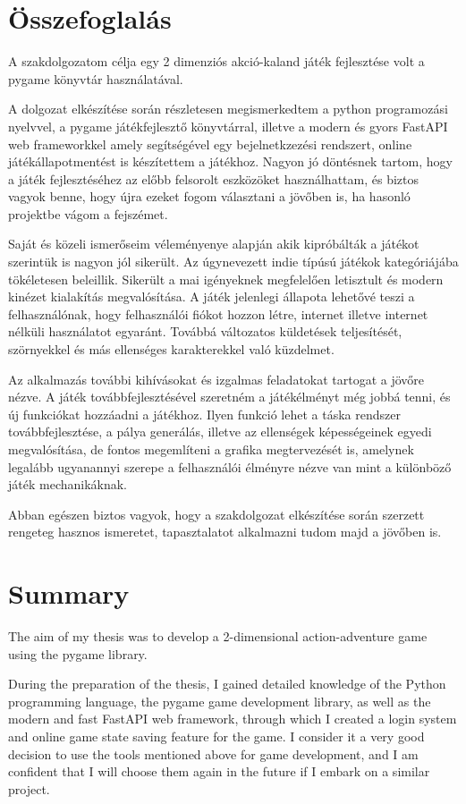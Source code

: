 \chapter{Összefoglalás}

\indent \indent A szakdolgozatom célja egy 2 dimenziós akció-kaland játék fejlesztése volt a pygame könyvtár használatával.

A dolgozat elkészítése során részletesen megismerkedtem a python programozási nyelvvel, a pygame játékfejlesztő könyvtárral, illetve a modern és gyors FastAPI web frameworkkel amely segítségével egy bejelnetkzezési rendszert, online játékállapotmentést is készítettem a játékhoz. Nagyon jó döntésnek tartom, hogy a játék fejlesztéséhez az előbb felsorolt eszközöket használhattam, és biztos vagyok benne, hogy újra ezeket fogom választani a jövőben is, ha hasonló projektbe vágom a fejszémet.

Saját és közeli ismerőseim véleményenye alapján akik kipróbálták a játékot szerintük is nagyon jól sikerült. Az úgynevezett indie típúsú játékok kategóriájába tökéletesen beleillik. Sikerült a mai igényeknek megfelelően letisztult és modern kinézet kialakítás megvalósítása. A játék jelenlegi állapota lehetővé teszi a felhasználónak, hogy felhasználói fiókot hozzon létre, internet illetve internet nélküli használatot egyaránt. Továbbá változatos küldetések teljesítését, szörnyekkel és más ellenséges karakterekkel való küzdelmet.

Az alkalmazás további kihívásokat és izgalmas feladatokat tartogat a jövőre nézve. A játék továbbfejlesztésével szeretném a játékélményt még jobbá tenni, és új funkciókat hozzáadni a játékhoz. Ilyen funkció lehet a táska rendszer továbbfejlesztése, a pálya generálás, illetve az ellenségek képességeinek egyedi megvalósítása, de fontos megemlíteni a grafika megtervezését is, amelynek legalább ugyanannyi szerepe a felhasználói élményre nézve van mint a különböző játék mechanikáknak.  

Abban egészen biztos vagyok, hogy a szakdolgozat elkészítése során szerzett rengeteg hasznos ismeretet, tapasztalatot alkalmazni tudom majd a jövőben is.

\chapter{Summary}

\indent \indent The aim of my thesis was to develop a 2-dimensional action-adventure game using the pygame library.

During the preparation of the thesis, I gained detailed knowledge of the Python programming language, the pygame game development library, as well as the modern and fast FastAPI web framework, through which I created a login system and online game state saving feature for the game. I consider it a very good decision to use the tools mentioned above for game development, and I am confident that I will choose them again in the future if I embark on a similar project.

